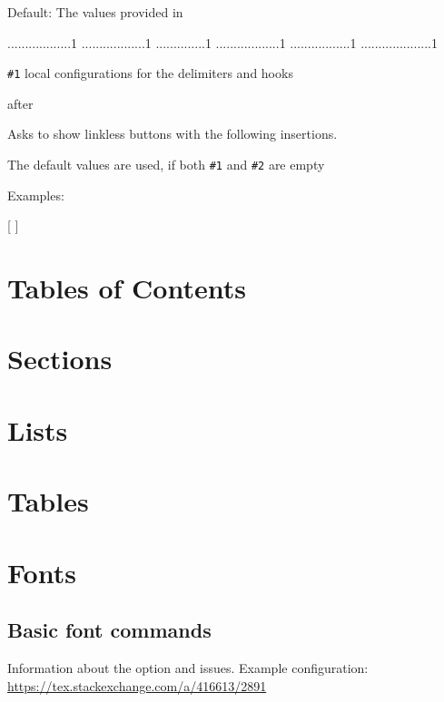 \documentclass{book}
\begin{document}
    Default: The values provided in 

\begin{texsource}
..................1
..................1
..............1
..................1
.................1
....................1
\end{texsource}

  \verb|#1| local configurations for the delimiters and hooks

 {after}\EndDoc

Asks to show linkless buttons with the following insertions.

The default values are used, if both \verb|#1| and \verb|#2| are empty

   Examples:

\begin{texsource}

    {[}
    {] }
\end{texsource}

\section{Tables of Contents}

\section{Sections}
\section{Lists}
\section{Tables}

\section{Fonts}
\subsection{Basic font commands}

Information about the  option and  issues. 
Example configuration:
\url{https://tex.stackexchange.com/a/416613/2891}
\end{document}
